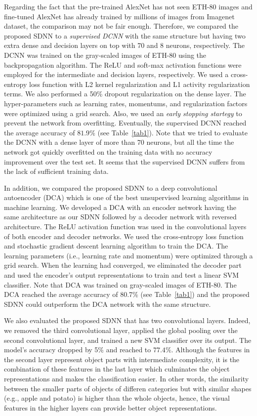 \documentclass[preprint,5p,12pt,twocolumn]{article}
\begin{document}
Regarding the fact that the pre-trained AlexNet has not seen ETH-80 images and fine-tuned AlexNet has already trained by millions of images from Imagenet dataset, the comparison may not be fair enough. Therefore, we compared the proposed SDNN to a \textit{supervised DCNN} with the same structure but having two extra dense and decision layers on top with 70 and 8 neurons, respectively. The DCNN was trained on the gray-scaled images of ETH-80 using the backpropagation algorithm. The ReLU and soft-max activation functions were employed for the intermediate and decision layers, respectively. We used a cross-entropy loss function with L2 kernel regularization and L1 activity regularization terms. We also performed a 50\% dropout regularization on the dense layer. The hyper-parameters such as learning rates, momentums, and regularization factors were optimized using a grid search. Also, we used an \textit{early stopping startegy} to prevent the network from overfitting. Eventually, the supervised DCNN reached the average accuracy of $81.9\%$ (see Table~\ref{tab1}). Note that we tried to evaluate the DCNN with a dense layer of more than 70 neurons, but all the time the network got quickly  overfitted on the training data with no accuracy improvement over the test set. It seems that the supervised DCNN suffers from the lack of sufficient training data.


In addition, we compared the proposed SDNN to a deep convolutional autoencoder (DCA) which is one of the best unsupervised learning algorithms in machine learning. We developed a DCA with an encoder network having the same architecture as our SDNN followed by a decoder network with reversed architecture. The ReLU activation function was used in the convolutional layers of both encoder and decoder networks. We used the cross-entropy loss function and stochastic gradient descent learning algorithm to train the DCA. The learning parameters (i.e., learning rate and momentum) were optimized through a grid search. When the learning had converged, we eliminated the decoder part and used the encoder's output representations to train and test a linear SVM classifier. Note that DCA was trained on gray-scaled images of ETH-80. The DCA reached the average accuracy of 80.7\% (see Table~\ref{tab1}) and the proposed SDNN could outperform the DCA network with the same structure.


We also evaluated the proposed SDNN that has two convolutional layers. Indeed, we removed the third convolutional layer, applied the global pooling over the second convolutional layer, and trained a new SVM classifier over its output. The model's accuracy dropped by 5\% and reached to $77.4\%$. Although the features in the second layer represent object parts with intermediate complexity, it is the combination of these features in the last layer which culminates the object representations and makes the classification easier. In other words, the  similarity between the smaller parts of objects of differen categories but with similar shapes (e.g., apple and potato) is higher than the whole objects, hence, the visual features in the higher layers can provide better object representations.
\end{document}
